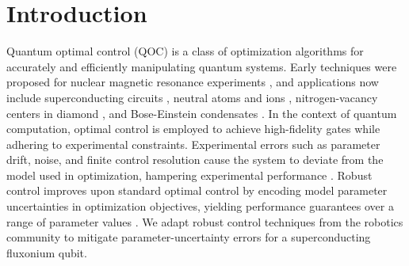 \section{Introduction}
Quantum optimal control (QOC) is a class of optimization
algorithms for accurately and efficiently manipulating quantum systems.
Early techniques were proposed for nuclear magnetic resonance experiments
\cite{vandersypen2005nmr, kehlet2004improving, khaneja2005optimal,
  maximov2008optimal, nielsen2010optimal, skinner2003application, tosner2009optimal},
and applications now include superconducting circuits \cite{abdelhafez2020universal,
  chakram2020multimode, egger2013optimized, fisher2010optimal, gokhale2019partial,
  huang2014optimal, heeres2017implementing, kelly2014optimal, leng2019robust,
  leung2017speedup, li2020fast,
  liebermann2016optimal, reinhold2019controlling,
  rebentrost2009optimal, rebentrost2009optimal2, spiteri2018quantum,
  sporl2007optimal},
neutral atoms and ions \cite{brouzos2015quantum,
  de2008optimal, grace2007optimal, goerz2011quantum, guo2019high, jensen2019time,
  larrouy2020fast, nebendahl2009optimal, omran2019generation,
  rosi2013fast,
  treutlein2006microwave, van2016optimal},
nitrogen-vacancy centers in diamond \cite{chou2015optimal,
  dolde2014high, geng2016experimental,
  nobauer2015smooth, poggiali2018optimal, rembold2020introduction, tian2019optimal},
and Bose-Einstein condensates \cite{amri2019optimal, doria2011optimal,
  sorensen2019qengine, sorensen2018quantum}.
In the context of quantum computation,
optimal control is employed to achieve high-fidelity gates
while adhering to experimental constraints.
Experimental errors such as parameter drift, noise, and
finite control resolution cause the system to deviate
from the model used in optimization, hampering
experimental performance
\cite{chakram2020multimode, heeres2017implementing, klimov2020snake,
  omran2019generation, reinhold2019controlling}.
Robust control improves upon
standard optimal control by encoding
model parameter uncertainties
in optimization objectives, yielding performance
guarantees over a range of parameter values \cite{Zhou97,Morimoto00,Manchester18}.
We adapt robust control techniques from the robotics community to mitigate
parameter-uncertainty errors for
a superconducting fluxonium qubit.

